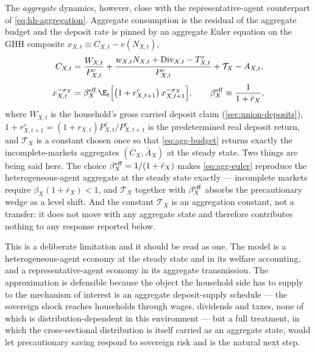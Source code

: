 The \emph{aggregate} dynamics, however, close with the representative-agent
counterpart of \eqref{eq:hh-aggregation}. Aggregate consumption is the residual of
the aggregate budget and the deposit rate is pinned by an aggregate Euler
equation on the GHH composite $x_{X,t}\equiv C_{X,t}-v(N_{X,t})$,
\begin{align}
C_{X,t}&=\frac{W_{X,t}}{P^{c}_{X,t}}
 +\frac{w_{X,t}N_{X,t}+\mathrm{Div}_{X,t}-T^{\tau}_{X,t}}{P^{c}_{X,t}}
 +\mathcal{T}_X-A_{X,t},
\label{eq:agg-budget}\\[3pt]
x_{X,t}^{-\sigma_X}
&=\beta^{\rm eff}_X\,
  \E_t\Bigl[\bigl(1+r^{c}_{X,t+1}\bigr)\,x_{X,t+1}^{-\sigma_X}\Bigr],
\qquad
\beta^{\rm eff}_X\equiv\frac{1}{1+\bar r_X},
\label{eq:agg-euler}
\end{align}
where $W_{X,t}$ is the household's gross carried deposit claim
(\cref{sec:union-deposits}), $1+r^{c}_{X,t+1}=(1+r_{X,t})P^{c}_{X,t}/P^{c}_{X,t+1}$
is the predetermined real deposit return, and $\mathcal{T}_X$ is a constant chosen
once so that \eqref{eq:agg-budget} returns exactly the incomplete-markets
aggregates $(\bar C_X,\bar A_X)$ at the steady state. Two things are being said
here. The choice $\beta^{\rm eff}_X=1/(1+\bar r_X)$ makes \eqref{eq:agg-euler}
reproduce the heterogeneous-agent aggregate at the steady state exactly ---
incomplete markets require $\beta_X(1+\bar r_X)<1$, and $\mathcal{T}_X$ together
with $\beta^{\rm eff}_X$ absorbs the precautionary wedge as a level shift. And
the constant $\mathcal{T}_X$ is an aggregation constant, not a transfer: it does
not move with any aggregate state and therefore contributes nothing to any
response reported below.

This is a deliberate limitation and it should be read as one. The model is a
heterogeneous-agent economy at the steady state and in its welfare accounting,
and a representative-agent economy in its aggregate transmission. The
approximation is defensible because the object the household side has to supply
to the mechanism of interest is an aggregate deposit-supply schedule --- the
sovereign shock reaches households through wages, dividends and taxes, none of
which is distribution-dependent in this environment --- but a full \citet{krusell1998income}
treatment, in which the cross-sectional distribution is itself carried as an
aggregate state, would let precautionary saving respond to sovereign risk and is
the natural next step.


